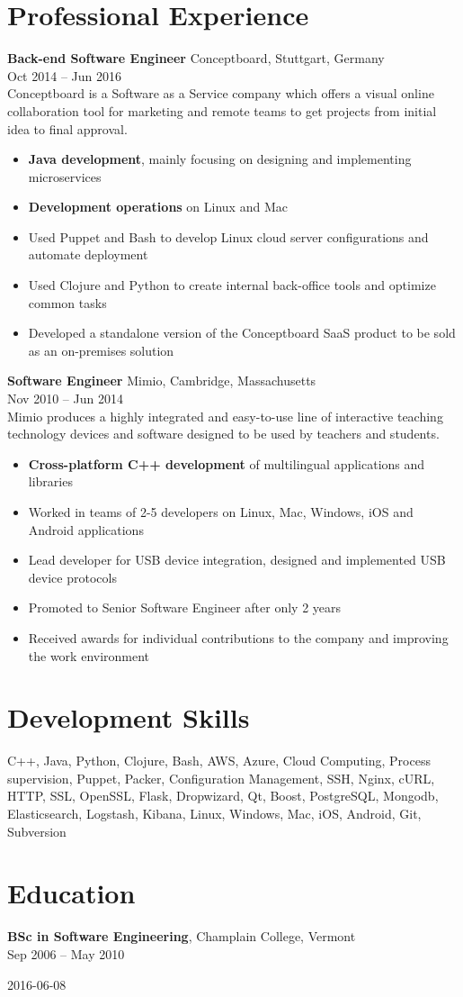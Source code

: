 \documentclass{article}
\newenvironment{bottompar}{\par\vspace*{\fill}}{\clearpage}
\begin{document}
\section*{Professional Experience}
{\bf Back-end Software Engineer} Conceptboard, Stuttgart, Germany\\
Oct 2014 -- Jun 2016\\
Conceptboard is a Software as a Service company which offers a visual online collaboration tool for marketing and remote teams to get projects from initial idea to final approval.
\begin{itemize}
  \itemsep0em
  \item {\bf Java development}, mainly focusing on designing and implementing microservices
  \item {\bf Development operations} on Linux and Mac
  \item Used Puppet and Bash to develop Linux cloud server configurations and automate deployment
  \item Used Clojure and Python to create internal back-office tools and optimize common tasks
  \item Developed a standalone version of the Conceptboard SaaS product to be sold as an on-premises solution
\end{itemize}
{\bf Software Engineer} Mimio, Cambridge, Massachusetts\\
Nov 2010 -- Jun 2014\\
Mimio produces a highly integrated and easy-to-use line of interactive teaching technology devices and software designed to be used by teachers and students.
\begin{itemize}
  \itemsep0em
  \item {\bf Cross-platform C++ development} of multilingual applications and libraries
  \item Worked in teams of 2-5 developers on Linux, Mac, Windows, iOS and Android applications
  \item Lead developer for USB device integration, designed and implemented USB device protocols
  \item Promoted to Senior Software Engineer after only 2 years
  \item Received awards for individual contributions to the company and improving the work environment\\
\end{itemize}

\section*{Development Skills}
C++, Java, Python, Clojure, Bash, AWS, Azure, Cloud Computing, Process supervision, Puppet, Packer, Configuration Management, SSH, Nginx, cURL, HTTP, SSL, OpenSSL, Flask, Dropwizard, Qt, Boost, PostgreSQL, Mongodb, Elasticsearch, Logstash, Kibana, Linux, Windows, Mac, iOS, Android, Git, Subversion\\

\section*{Education}
{\bf BSc in Software Engineering}, Champlain College, Vermont\\
Sep 2006 -- May 2010\\


\begin{bottompar}
\begin{center}
{\small 2016-06-08}
\end{center}
\end{bottompar}
\end{document}

